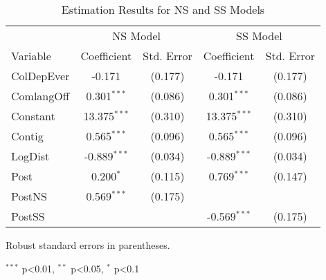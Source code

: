 
\begin{table}[H]
    \centering
    \begin{threeparttable}
        \begin{tabular}{lcccc}
            \toprule
            & \multicolumn{2}{c}{NS Model} & \multicolumn{2}{c}{SS Model} \\
            \cmidrule(lr){2-3} \cmidrule(lr){4-5}
            Variable & Coefficient & Std. Error & Coefficient & Std. Error \\
            \midrule
            ColDepEver & -0.171 & (0.177) & -0.171 & (0.177) \\
            ComlangOff & 0.301$^{\ast\ast\ast}$ & (0.086) & 0.301$^{\ast\ast\ast}$ & (0.086) \\
            Constant & 13.375$^{\ast\ast\ast}$ & (0.310) & 13.375$^{\ast\ast\ast}$ & (0.310) \\
            Contig & 0.565$^{\ast\ast\ast}$ & (0.096) & 0.565$^{\ast\ast\ast}$ & (0.096) \\
            LogDist & -0.889$^{\ast\ast\ast}$ & (0.034) & -0.889$^{\ast\ast\ast}$ & (0.034) \\
            Post & 0.200$^{\ast}$ & (0.115) & 0.769$^{\ast\ast\ast}$ & (0.147) \\
            PostNS & 0.569$^{\ast\ast\ast}$ & (0.175) &  &  \\
            PostSS &  &  & -0.569$^{\ast\ast\ast}$ & (0.175) \\

            \bottomrule
        \end{tabular}
        \begin{tablenotes}
            \footnotesize
            \item Robust standard errors in parentheses.
            \item $^{\ast\ast\ast}$ p<0.01, $^{\ast\ast}$ p<0.05, $^{\ast}$ p<0.1
        \end{tablenotes}
    \end{threeparttable}
    \caption{Estimation Results for NS and SS Models}
    \label{tab:ns_ss_post_model}
\end{table}
